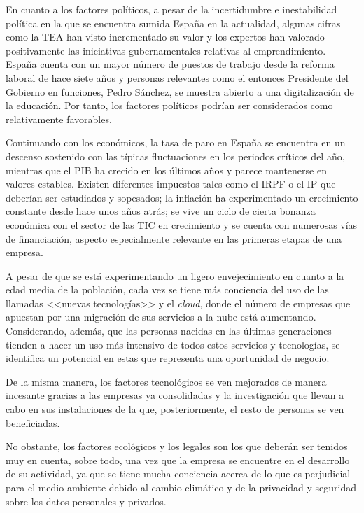 En cuanto a los factores políticos, a pesar de la incertidumbre e inestabilidad política en la que se encuentra sumida España en la actualidad, algunas cifras como la \acs{TEA} han visto incrementado su valor y los expertos han valorado positivamente las iniciativas gubernamentales relativas al emprendimiento. España cuenta con un mayor número de puestos de trabajo desde la reforma laboral de hace siete años y personas relevantes como el entonces Presidente del Gobierno en funciones, Pedro Sánchez, se muestra abierto a una digitalización de la educación. Por tanto, los factores políticos podrían ser considerados como relativamente favorables.

Continuando con los económicos, la tasa de paro en España se encuentra en un descenso sostenido con las típicas fluctuaciones en los periodos críticos del año, mientras que el \acs{PIB} ha crecido en los últimos años y parece mantenerse en valores estables. Existen diferentes impuestos tales como el \acs{IRPF} o el \acs{IP} que deberían ser estudiados y sopesados; la inflación ha experimentado un crecimiento constante desde hace unos años atrás; se vive un ciclo de cierta bonanza económica con el sector de las \acs{TIC} en crecimiento y se cuenta con numerosas vías de financiación, aspecto especialmente relevante en las primeras etapas de una empresa.



A pesar de que se está experimentando un ligero envejecimiento en cuanto a la edad media de la población, cada vez se tiene más conciencia del uso de las llamadas <<nuevas tecnologías>> y el \textit{cloud}, donde el número de empresas que apuestan por una migración de sus servicios a la nube está aumentando. Considerando, además, que las personas nacidas en las últimas generaciones tienden a hacer un uso más intensivo de todos estos servicios y tecnologías, se identifica un potencial en estas que representa una oportunidad de negocio.

De la misma manera, los factores tecnológicos se ven mejorados de manera incesante gracias a las empresas ya consolidadas y la investigación que llevan a cabo en sus instalaciones de la que, posteriormente, el resto de personas se ven beneficiadas.

No obstante, los factores ecológicos y los legales son los que deberán ser tenidos muy en cuenta, sobre todo, una vez que la empresa se encuentre en el desarrollo de su actividad, ya que se tiene mucha conciencia acerca de lo que es perjudicial para el medio ambiente debido al cambio climático y de la privacidad y seguridad sobre los datos personales y privados.



